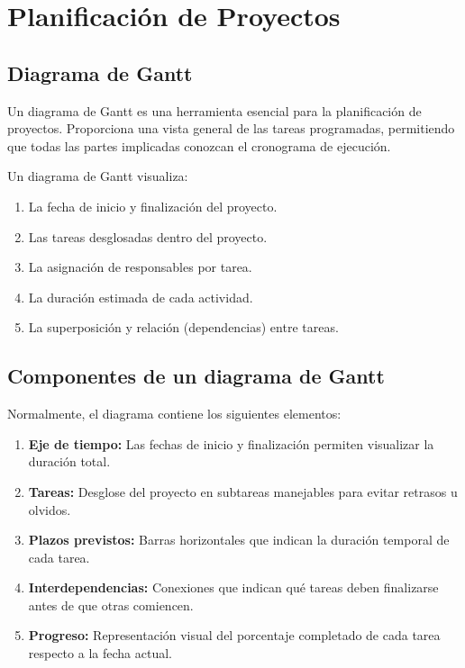 \documentclass[../main]{subfiles}
\begin{document}
\chapter{Planificación de Proyectos}



\section{Diagrama de Gantt}
Un diagrama de Gantt es una herramienta esencial para la planificación de proyectos. Proporciona una vista general de las tareas programadas, permitiendo que todas las partes implicadas conozcan el cronograma de ejecución.

Un diagrama de Gantt visualiza:
\begin{enumerate}
    \item La fecha de inicio y finalización del proyecto.
    \item Las tareas desglosadas dentro del proyecto.
    \item La asignación de responsables por tarea.
    \item La duración estimada de cada actividad.
    \item La superposición y relación (dependencias) entre tareas.
\end{enumerate}

\section{Componentes de un diagrama de Gantt}
Normalmente, el diagrama contiene los siguientes elementos:
\begin{enumerate}
    \item \textbf{Eje de tiempo:} Las fechas de inicio y finalización permiten visualizar la duración total.
    \item \textbf{Tareas:} Desglose del proyecto en subtareas manejables para evitar retrasos u olvidos.
    \item \textbf{Plazos previstos:} Barras horizontales que indican la duración temporal de cada tarea.
    \item \textbf{Interdependencias:} Conexiones que indican qué tareas deben finalizarse antes de que otras comiencen.
    \item \textbf{Progreso:} Representación visual del porcentaje completado de cada tarea respecto a la fecha actual.
\end{enumerate}
\end{document}
